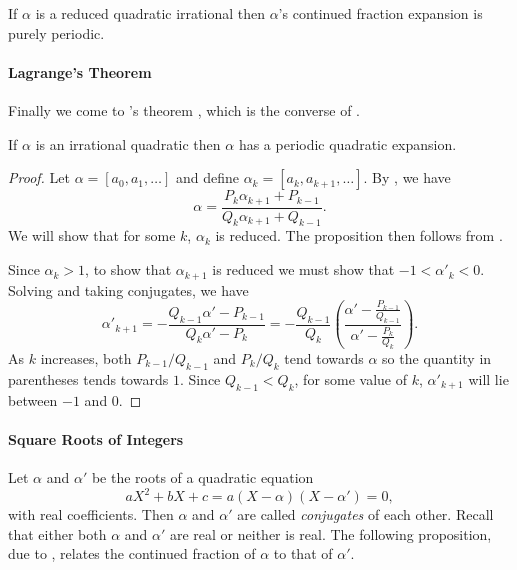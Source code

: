 \begin{proposition}\label{CF:Reduced:Periodic:Prop}  
If $\alpha$ is a reduced quadratic irrational then $\alpha$'s
continued fraction expansion is purely periodic.
\end{proposition}


\paragraph{Lagrange's Theorem}

Finally we come to {\Lagrange}'s theorem \cite{Lagrange68}, which is the
converse of .

\begin{proposition}[Lagrange]
If $\alpha$ is an irrational quadratic then $\alpha$ has a periodic
quadratic expansion.
\end{proposition}
\begin{proof}
Let $\alpha = [a_0, a_1, \ldots]$ and define $\alpha_k = [a_k,
a_{k+1}, \ldots]$.  By , we have
\begin{equation}\label{CF:Lagrange:1:Eq}
\alpha = \frac{P_k \alpha_{k+1} + P_{k-1}}{Q_{k} \alpha_{k+1} + Q_{k-1}}.
\end{equation}
We will show that for some $k$, $\alpha_k$ is reduced.  The
proposition then follows from . 

Since $\alpha_k > 1$, to show that $\alpha_{k+1}$ is reduced we must show
that $-1 < \alpha'_k < 0$.  Solving  and
taking conjugates, we have
\[
\alpha'_{k+1} = - \frac{Q_{k-1} \alpha' - P_{k-1}}{Q_k \alpha' - P_k}
 = - \frac{Q_{k-1}}{Q_k} 
  \left(\frac{\displaystyle\alpha' -
    \frac{P_{k-1}}{Q_{k-1}}}{\displaystyle\alpha' -
           \frac{P_{k}}{Q_{k}}}\right).
\]
As $k$ increases, both $P_{k-1}/Q_{k-1}$ and $P_k/Q_k$ tend towards
$\alpha$ so the quantity in parentheses tends towards $1$.  Since
$Q_{k-1} < Q_k$, for some value of $k$, $\alpha'_{k+1}$ will lie between
$-1$ and $0$.
\end{proof}

\paragraph{Square Roots of Integers}

Let $\alpha$ and $\alpha'$ be the roots of a quadratic equation
\[
aX^2 + bX + c = a (X - \alpha) (X - \alpha') = 0,
\]
with real coefficients.  Then $\alpha$ and $\alpha'$ are called {\em
conjugates} of each other.
Recall that either both $\alpha$ and $\alpha'$ are real or neither is
real.  The following proposition, due to {\Galois} \cite{Galois:CF},
relates the continued fraction of $\alpha$ to that of $\alpha'$.


